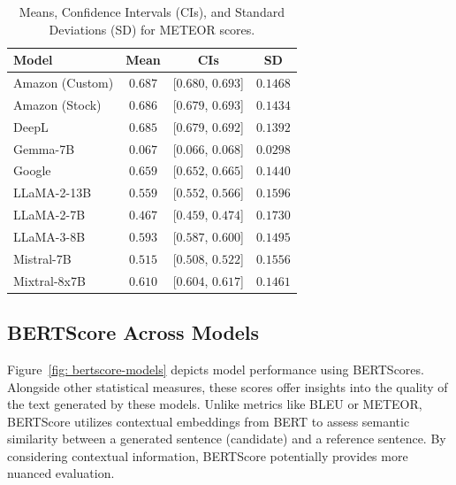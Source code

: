 \begin{table}[htb]
\centering
\begin{tabular}{lccc}
\toprule
\textbf{Model} & \textbf{Mean} & \textbf{CIs} & \textbf{SD} \\
\midrule
Amazon (Custom) & $\mathbf{0.687}$ & [$0.680$, $0.693$] & $0.1468$ \\
Amazon (Stock) & $0.686$ & [$0.679$, $0.693$] & $0.1434$ \\
DeepL & $0.685$ & [$0.679$, $0.692$] & $0.1392$ \\
Gemma-7B & $0.067$ & [$0.066$, $0.068$] & $0.0298$ \\
Google & $0.659$ & [$0.652$, $0.665$] & $0.1440$ \\
LLaMA-2-13B & $0.559$ & [$0.552$, $0.566$] & $0.1596$ \\
LLaMA-2-7B & $0.467$ & [$0.459$, $0.474$] & $0.1730$ \\
LLaMA-3-8B & $0.593$ & [$0.587$, $0.600$] & $0.1495$ \\
Mistral-7B & $0.515$ & [$0.508$, $0.522$] & $0.1556$ \\
Mixtral-8x7B & $0.610$ & [$0.604$, $0.617$] & $0.1461$ \\
\bottomrule
\end{tabular}
\caption{Means, Confidence Intervals (CIs), and Standard Deviations (SD) for METEOR scores.}
\label{tab:mean_ci_scores_meteor}
\end{table}


\subsection{BERTScore Across Models}

Figure~\ref{fig: bertscore-models} depicts model performance using BERTScores. Alongside other statistical measures, these scores offer insights into the quality of the text generated by these models. Unlike metrics like BLEU or METEOR, BERTScore utilizes contextual embeddings from BERT to assess semantic similarity between a generated sentence (candidate) and a reference sentence. By considering contextual information, BERTScore potentially provides more nuanced evaluation. %

